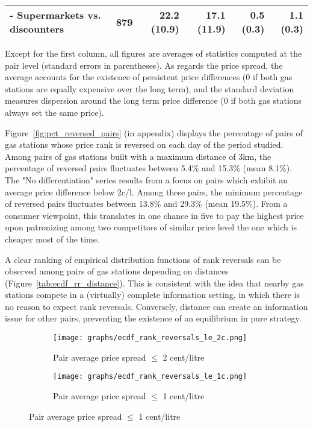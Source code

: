 \documentclass[english]{article}
\begin{document}
\begin{table}
\begin{threeparttable}
\begin{tabular}{lrrrrr}
    \hspace*{4mm} - Supermarkets vs. discounters & 879   & 22.2 (10.9) & 17.1 (11.9) & 0.5 (0.3) & 1.1 (0.3) \\
    \bottomrule
    \bottomrule
\end{tabular}
\begin{tablenotes}
			\small
      \item Except for the first column, all figures are averages of statistics computed at the pair level (standard errors in parentheses). As regards the price spread, the average accounts for the existence of persistent price differences (0 if both gas stations are equally expensive over the long term), and the standard deviation measures dispersion around the long term price difference (0 if both gas stations always set the same price).
\end{tablenotes}
\end{threeparttable}
\end{table}

Figure~\ref{fig:pct_reversed_pairs} (in appendix) displays the percentage of pairs of gas stations whose price rank is reversed on each day of the period studied. Among pairs of gas stations built with a maximum distance of 3km, the percentage of reversed pairs fluctuates between 5.4\% and 15.3\%  (mean 8.1\%). The "No differentiation" series results from a focus on pairs which exhibit an average price difference below 2c/l. Among these pairs, the minimum percentage of reversed pairs fluctuates between 13.8\% and 29.3\% (mean 19.5\%). From a consumer viewpoint, this translates in one chance in five to pay the highest price upon patronizing among two competitors of similar price level the one which is cheaper most of the time.

A clear ranking of empirical distribution functions of rank reversals can be observed among pairs of gas stations depending on distances (Figure~\ref{tab:ecdf_rr_distance}). This is consistent with the idea that nearby gas stations compete in a (virtually) complete information setting, in which there is no reason to expect rank reversals. Conversely, distance can create an information issue for other pairs, preventing the existence of an equilibrium in pure strategy.

\begin{figure}[H]
\centering
\caption{Empirical distribution functions of rank reversals (raw prices)}
\label{tab:ecdf_rr_distance}
\begin{subfigure}{.49\textwidth}
\centering
\texttt{[image: graphs/ecdf\_rank\_reversals\_le\_2c.png]}
\caption[short]{Pair average price spread $\le$ 2 cent/litre}
\end{subfigure}
\begin{subfigure}{.49\textwidth}
\centering
\texttt{[image: graphs/ecdf\_rank\_reversals\_le\_1c.png]}
\caption[short]{Pair average price spread $\le$ 1 cent/litre}
\end{subfigure}
\end{figure}
\end{document}
